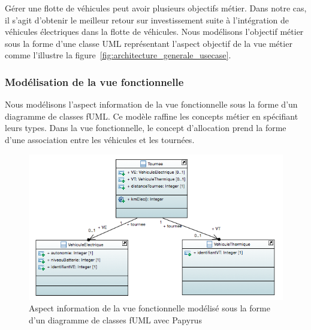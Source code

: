 Gérer une flotte de véhicules peut
avoir plusieurs objectifs métier. Dans notre cas, il s'agit d'obtenir le meilleur retour sur
investissement suite à l'intégration de véhicules électriques dans la flotte de
véhicules. Nous modélisons l'objectif métier sous la forme d'une classe UML
représentant l'aspect objectif de la vue métier comme l'illustre la 
figure~\ref{fig:architecture_generale_usecase}.

	

\subsubsection{Modélisation de la vue fonctionnelle}

Nous modélisons l'aspect information de la vue fonctionnelle sous la forme d'un diagramme de classes
fUML. Ce modèle raffine les concepts métier en spécifiant leurs types. Dans la
vue fonctionnelle, le concept d'allocation prend la forme d'une association
entre les véhicules et les tournées. 

\begin{figure}[!htbp]
 \begin{center}
  \includegraphics[width=1\textwidth]{figures/5_implementation/information_fonctionnelle.png}
 \end{center}
 \caption{Aspect information de la vue fonctionnelle modélisé sous la forme d'un diagramme de classes fUML avec Papyrus}
 \label{fig:information_fonctionnelle}
\end{figure}

